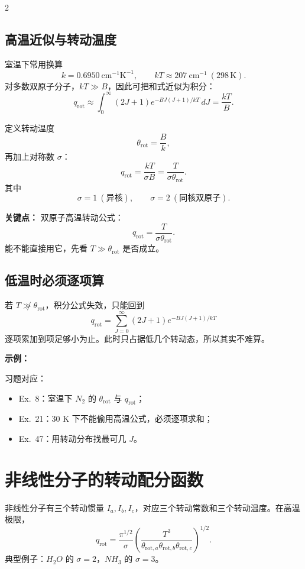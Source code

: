 \documentclass[a4paper,9pt]{article}
\newenvironment{keypoint}
{\par\vspace{0.3em}\noindent\begin{tcolorbox}[
  colback=keybg,
  colframe=keycolor,
  boxrule=0.5pt,
  arc=2pt,
  left=2pt,
  right=2pt,
  top=2pt,
  bottom=2pt,
  boxsep=0pt,
  ]
\noindent\textcolor{keycolor}{\textbf{关键点：}}}
{\end{tcolorbox}\par\vspace{0.3em}}
\newenvironment{examplebox}
{\par\vspace{0.3em}\noindent\begin{tcolorbox}[
  colback=boxbg,
  colframe=derivcolor,
  boxrule=0.5pt,
  arc=2pt,
  left=2pt,
  right=2pt,
  top=2pt,
  bottom=2pt,
  boxsep=0pt,
  ]
\scriptsize\noindent\textcolor{derivcolor}{\textbf{示例：}}\par
\setlength{\parskip}{0.1ex}\setlength{\itemsep}{0pt}\setlength{\parsep}{0pt}}
{\end{tcolorbox}\par\vspace{0.3em}}
\begin{document}
\begin{multicols}{2}
	\subsection{高温近似与转动温度}
	室温下常用换算
	\[
		k=0.6950\ \mathrm{cm^{-1}K^{-1}},
		\qquad
		kT\approx 207\ \mathrm{cm^{-1}}\ (298\,\mathrm K).
	\]
	对多数双原子分子，$kT\gg B$，因此可把和式近似为积分：
	\[
		q_{\mathrm{rot}}\approx \int_0^{\infty}(2J+1)e^{-BJ(J+1)/kT}\,dJ
		=\frac{kT}{B}.
	\]

	定义转动温度
	\[
		\theta_{\mathrm{rot}}=\frac{B}{k},
	\]
	再加上对称数 $\sigma$：
	\[
		q_{\mathrm{rot}}=\frac{kT}{\sigma B}=\frac{T}{\sigma\theta_{\mathrm{rot}}}.
	\]
	其中
	\[
		\sigma=1\ (\text{异核}),\qquad \sigma=2\ (\text{同核双原子}).
	\]

	\begin{keypoint}
		双原子高温转动公式：
		\[
			q_{\mathrm{rot}}=\frac{T}{\sigma\theta_{\mathrm{rot}}}.
		\]
		能不能直接用它，先看 $T\gg\theta_{\mathrm{rot}}$ 是否成立。
	\end{keypoint}

	\subsection{低温时必须逐项算}
	若 $T\not\gg\theta_{\mathrm{rot}}$，积分公式失效，只能回到
	\[
		q_{\mathrm{rot}}=\sum_{J=0}^{\infty}(2J+1)e^{-BJ(J+1)/kT}
	\]
	逐项累加到项足够小为止。此时只占据低几个转动态，所以其实不难算。

	\begin{examplebox}
		习题对应：
		\begin{itemize}
			\item Ex.~8：室温下 $N_2$ 的 $\theta_{\mathrm{rot}}$ 与 $q_{\mathrm{rot}}$；
			\item Ex.~21：30 K 下不能偷用高温公式，必须逐项求和；
			\item Ex.~47：用转动分布找最可几 $J$。
		\end{itemize}
	\end{examplebox}

	\section{非线性分子的转动配分函数}

	非线性分子有三个转动惯量 $I_a,I_b,I_c$，对应三个转动常数和三个转动温度。在高温极限，
	\[
		q_{\mathrm{rot}}=\frac{\pi^{1/2}}{\sigma}
		\left(\frac{T^3}{\theta_{\mathrm{rot},a}\theta_{\mathrm{rot},b}\theta_{\mathrm{rot},c}}\right)^{1/2}.
	\]
	典型例子：$H_2O$ 的 $\sigma=2$，$NH_3$ 的 $\sigma=3$。


\end{multicols}
\end{document}
